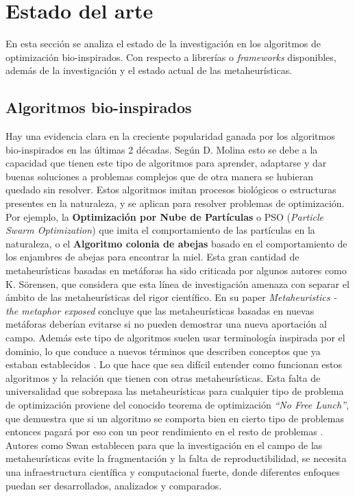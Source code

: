 \chapter{Estado del arte}

En esta sección se analiza el estado de la investigación en los algoritmos de optimización bio-inspirados. Con respecto a librerías o \emph{frameworks} disponibles,
además de la investigación y el estado actual de las metaheurísticas.

\section{Algoritmos bio-inspirados}

Hay una evidencia clara en la creciente popularidad ganada por los algoritmos bio-inspirados en las últimas 2 décadas. Según D. Molina \cite{Molina2020ComprehensiveTO} esto se
debe a la capacidad que tienen este tipo de algoritmos para aprender, adaptarse y dar buenas soluciones a problemas complejos que de otra manera se hubieran quedado sin
resolver. Estos algoritmos imitan procesos biológicos o estructuras presentes en la naturaleza, y se aplican para resolver problemas de optimización. Por ejemplo, 
la \textbf{Optimización por Nube de Partículas} o PSO (\textit{Particle Swarm Optimization}) que imita el comportamiento de las partículas en la naturaleza, o 
el \textbf{Algoritmo colonia de abejas} basado en el comportamiento de los enjambres de abejas para encontrar la miel. Esta gran cantidad de metaheurísticas basadas en 
metáforas ha sido criticada por algunos autores como K. Sörensen\cite{metaphor_exposed}, que considera que esta línea de investigación amenaza con separar el ámbito de 
las metaheurísticas del rigor científico. En su paper \emph{Metaheuristics - the metaphor exposed} concluye que las metaheurísticas basadas en nuevas metáforas deberían 
evitarse si no pueden demostrar una nueva aportación al campo. Además este tipo de algoritmos suelen usar terminología inspirada por el dominio, lo que conduce a nuevos 
términos que describen conceptos que ya estaban establecidos  \cite{mitigating_metaphors}. Lo que hace que sea difícil entender como funcionan estos algoritmos y la relación 
que tienen con otras metaheurísticas. Esta falta de universalidad que sobrepasa las metaheurísticas para cualquier tipo de problema de optimización proviene
del conocido teorema de optimización \emph{``No Free Lunch''}, que demuestra que si un algoritmo se comporta bien en cierto tipo de problemas entonces pagará por eso
con un peor rendimiento en el resto de problemas \cite{585893}. Autores como Swan \cite{metaheuristics} establecen  para que la investigación en el campo de las metaheurísticas evite la fragmentación y la falta de reproductibilidad, se 
necesita una infraestructura científica y computacional fuerte, donde diferentes enfoques puedan ser desarrollados, analizados y comparados. 

